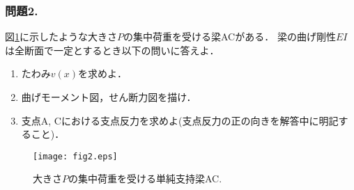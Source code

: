 \documentclass[10pt,a4j]{jarticle}
\begin{document}
\subsubsection*{問題2. }
図\ref{fig:fig2}に示したような大きさ$P$の集中荷重を受ける梁ACがある．
梁の曲げ剛性$EI$は全断面で一定とするとき以下の問いに答えよ．
\begin{enumerate}
\item
	たわみ$v(x)$を求めよ．		
\item
	曲げモーメント図，せん断力図を描け．
\item
	支点A, Cにおける支点反力を求めよ(支点反力の正の向きを解答中に明記すること)．
\end{enumerate}
\begin{figure}[h]
	\begin{center}
	\texttt{[image: fig2.eps]} 
	\end{center}
	\vspace{-5mm}
	\caption{大きさ$P$の集中荷重を受ける単純支持梁AC.}
	\label{fig:fig2}
\end{figure}
\end{document}
